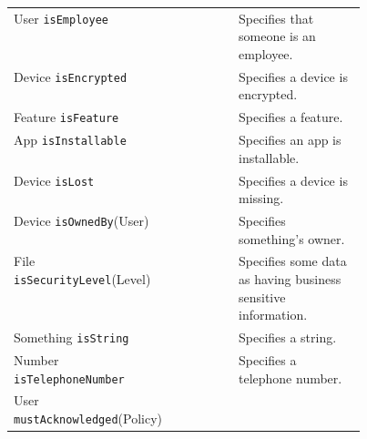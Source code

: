 \documentclass{easychair}
\newcommand{\cmark}{\ding{51}}%
\begin{document}
\begin{table}
\begin{tabular}{l c c c c c p{0.45\linewidth} }
    User \texttt{isEmployee}                    & \cmark                 & \cmark                  &                     & \cmark            & \cmark
    & Specifies that someone is an employee.                                               \\
    Device \texttt{isEncrypted}                 &                        & \cmark                  &                     & \cmark            & \cmark
    & Specifies a device is encrypted.                                                     \\
    Feature \texttt{isFeature}                  & \cmark                 &                         &                     &                   & \cmark
    & Specifies a feature.                                                                 \\
    App \texttt{isInstallable}                  &                        &                         &                     & \cmark            & \cmark
    & Specifies an app is installable.                                                     \\
    Device \texttt{isLost}                      & \cmark                 &                         & \cmark              & \cmark            & \cmark
    & Specifies a device is missing.                                                       \\
    Device \texttt{isOwnedBy}(User)             & \cmark                 & \cmark                  & \cmark              & \cmark            & \cmark
    & Specifies something's owner.                                                         \\
    File \texttt{isSecurityLevel}(Level)        &                        &                         & \cmark              &                   & \cmark
    & Specifies some data as having business sensitive information.                        \\
    Something \texttt{isString}                 & \cmark                 &                         &                     & \cmark            &
    & Specifies a string.                                                                  \\
    Number \texttt{isTelephoneNumber}           &                        &                         &                     & \cmark            & \cmark
    & Specifies a telephone number.                                                        \\
    User \texttt{mustAcknowledged}(Policy)      & \cmark                 & \cmark                  & \cmark              & \cmark            & \cmark

\end{tabular}
\end{table}
\end{document}
